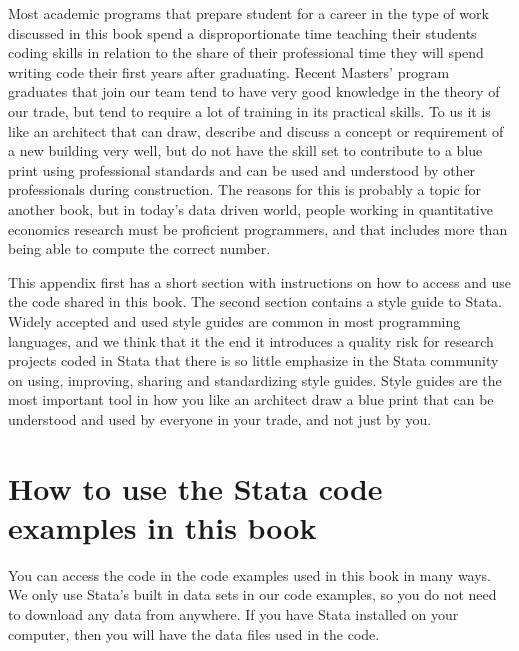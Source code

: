 
\begin{fullwidth}
	
Most academic programs that prepare student for a career in the type of work discussed in this book 
spend a disproportionate time teaching their students coding skills in relation to the share of 
their professional time they will spend writing code their first years after graduating. Recent 
Masters' program graduates that join our team tend to have very good knowledge in the theory of our
trade, but tend to require a lot of training in its practical skills. To us it is like an architect 
that can draw, describe and discuss a concept or requirement of a new building very well, but do 
not have the skill set to contribute to a blue print using professional standards and can be used 
and understood by other professionals during construction. The reasons for this is probably a topic
for another book, but in today's data driven world, people working in quantitative economics research 
must be proficient programmers, and that includes more than being able to compute the correct number.

This appendix first has a short section with instructions on how to access and use the code shared in 
this book. The second section contains a style guide to Stata. Widely accepted and used style guides 
are common in most programming languages, and we think that it the end it introduces a quality risk 
for research projects coded in Stata that there is so little emphasize in the Stata community on using, 
improving, sharing and standardizing style guides. Style guides are the most important tool in how 
you like an architect draw a blue print that can be understood and used by everyone in your trade, 
and not just by you.


\end{fullwidth}


\section{How to use the Stata code examples in this book}

You can access the code in the code examples used in this book in many ways. We only use Stata's built
in data sets in our code examples, so you do not need to download any data from anywhere. If you have 
Stata installed on your computer, then you will have the data files used in the code. 

